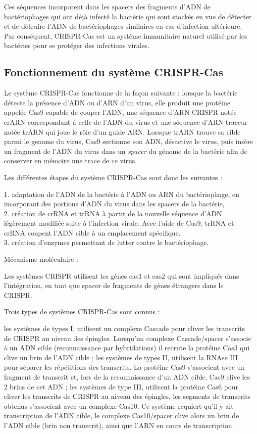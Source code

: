 \documentclass[twoside,a4paper,11pt,frenchb,openany]{report}
\begin{document}
Ces séquences incorporent dans les spacers des fragments d'ADN de bactériophages qui ont déjà infecté la bactérie qui sont stockés en vue de détecter et de détruire l'ADN de bactériophages similaires en cas d'infection ultérieure. Par conséquent, CRISPR-Cas est un système immunitaire naturel utilisé par les bactéries pour se protéger des infections virales. 





\subsection{Fonctionnement du système CRISPR-Cas}

Le système CRISPR-Cas fonctionne de la façon suivante : lorsque la bactérie détecte la présence d'ADN ou d'ARN d'un virus, elle produit une protéine appelée Cas9 capable de couper l'ADN, une séquence d'ARN CRISPR notée crARN correspondant à celle de l'ADN du virus et une séquence d'ARN traceur notée trARN qui joue le rôle d'un guide ARN. Lorsque trARN trouve sa cible parmi le genome du virus, Cas9 sectionne son ADN, désactive le virus, puis insère un fragment de l'ADN du virus dans un \textit{spacer} du génome de la bactérie afin de conserver en mémoire une trace de ce virus.

Les différentes étapes du système CRISPR-Cas sont donc les suivantes :

1. adaptation de l'ADN de la bactérie à l'ADN ou ARN du bactériophage, en incorporant des portions d'ADN du virus dans les spacers de la bactérie,\\
2. création de crRNA et trRNA à partir de la nouvelle séquence d'ADN légèrement modifiée suite à l'infection virale. Avec l'aide de Cas9, trRNA et crRNA coupent l'ADN cible à un emplacement spécifique.\\
3. création d'enzymes permettant de lutter contre le bactériophage.

Mécanisme moléculaire :

Les systèmes CRISPR utilisent les gènes cas1 et cas2 qui sont impliqués dans l'intégration, en tant que spacer de fragments de gènes étrangers dans le CRISPR.

Trois types de systèmes CRISPR-Cas sont connus :

les systèmes de types I, utilisent un complexe Cascade pour cliver les transcrits de CRISPR au niveau des épingles. Lorsqu'un complexe Cascade/spacer s'associe à un ADN cible (reconnaissance par hybridations) il recrute la protéine Cas3 qui clive un brin de l'ADN cible ;
les systèmes de types II, utilisent la RNAse III pour séparer les répétitions des transcrits. La protéine Cas9 s'associent avec un fragment de transcrit et, lors de la reconnaissance d'un ADN cible, Cas9 clive les 2 brins de cet ADN ;
les systèmes de type III, utilisent la protéine Cas6 pour cliver les transcrits de CRISPR au niveau des épingles, les segments de transcrits obtenus s'associent avec un complexe Cas10. Ce système requiert qu'il y ait transcription de l'ADN cible, le complexe Cas10/spacer clive alors un brin de l'ADN cible (brin non transcrit), ainsi que l'ARN en cours de transcription.
\end{document}
